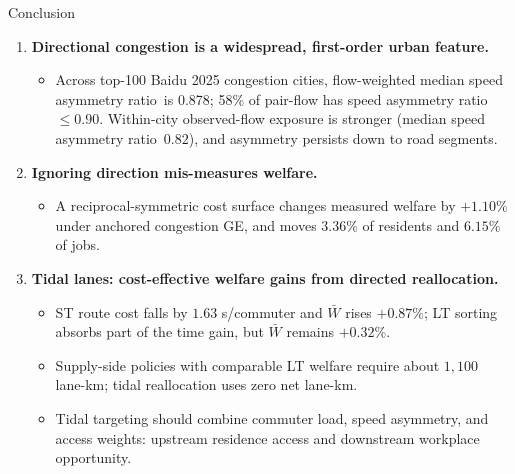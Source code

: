 \documentclass[11pt,aspectratio=169]{beamer}
\newcommand{\good}[1]{\textcolor{blue!70!black}{#1}}
\newcommand{\bad}[1]{\textcolor{red!70!black}{#1}}
\newcommand{\SAR}{speed asymmetry ratio}
\begin{document}
\begin{frame}{Conclusion}
\begin{enumerate}
  \item \textbf{Directional congestion is a widespread, first-order urban feature.}
  \begin{itemize}\footnotesize
    \item Across top-100 Baidu 2025 congestion cities, flow-weighted median \SAR\ is \good{0.878}; \good{58\%} of pair-flow has \SAR\ $\leq0.90$. Within-city observed-flow exposure is stronger (median \SAR\ $0.82$), and asymmetry persists down to road segments.
  \end{itemize}
  \item \textbf{Ignoring direction mis-measures welfare.}
  \begin{itemize}\footnotesize
    \item A reciprocal-symmetric cost surface changes measured welfare by \good{$+1.10\%$} under anchored congestion GE, and moves \good{$3.36\%$} of residents and \good{$6.15\%$} of jobs.
  \end{itemize}
  \item \textbf{Tidal lanes: cost-effective welfare gains from directed reallocation.}
  \begin{itemize}\footnotesize
    \item ST route cost falls by \good{$1.63$ s/commuter} and $\bar W$ rises \good{$+0.87\%$}; LT sorting absorbs part of the time gain, but $\bar W$ remains \good{$+0.32\%$}.
    \item Supply-side policies with comparable LT welfare require about \bad{$1{,}100$ lane-km}; tidal reallocation uses \good{zero net lane-km}.
    \item Tidal targeting should combine commuter load, speed asymmetry, and access weights: upstream residence access and downstream workplace opportunity.
  \end{itemize}
\end{enumerate}
\end{frame}

\end{document}
